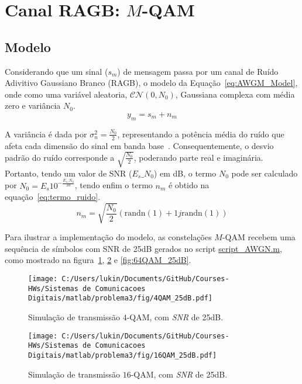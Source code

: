 \section{Canal RAGB: \texorpdfstring{$M$}{M}-QAM}
\subsection{Modelo}
Considerando que um sinal ($s_m$) de mensagem passa por um canal de Ruído Adivitivo Gaussiano Branco (RAGB), o modelo da Equação~\ref{eq:AWGM_Model}, onde como uma variável aleatoria, $\mathcal{C} \mathcal{N} (0,N_0)$, Gaussiana complexa com média zero e variância $N_0$. 
\begin{equation}
    y_m = s_m + n_m
    \label{eq:AWGM_Model}
\end{equation}

A variância é dada por $\sigma_{n}^{2} = \frac{N_0}{2}$, representando a potência média do ruído que afeta cada dimensão do sinal em banda base~\cite{Proakis}. Consequentemente, o desvio padrão do ruído corresponde a $\sqrt{\frac{N_0}{2}}$, poderando parte real e imaginária. Portanto, tendo um valor de SNR ($E_s\_N_0$) em dB, o termo $N_0$ pode ser calculado por $N_0= E_s 10^{-\frac{E_s\_N_0}{10}}$, tendo enfim o termo $n_m$ é obtido na equação~\ref{eq:termo_ruido}.
\begin{equation}
    n_m = \sqrt{\frac{N_0}{2}} \left(\text{randn}(1) + 1j \text{randn}(1)\right)
    \label{eq:termo_ruido}
\end{equation}

Para ilustrar a implementação do modelo, as constelações $M$-QAM recebem uma sequência de símbolos com SNR de 25dB gerados no script \href{https://raw.githubusercontent.com/lucasabdalah/Courses-HWs/SCD/Sistemas%20de%20Comunicacoes%20Digitais/matlab/problema3/script_AWGN.m}{\colorbox{gray!10}{\color{red}script\_AWGN.m}}, como mostrado na figura~\ref{fig:4QAM_25dB}, \ref{fig:16QAM_25dB} e \ref{fig:64QAM_25dB}.

\begin{figure}[!ht]
    \centering
    \texttt{[image: C:/Users/lukin/Documents/GitHub/Courses-HWs/Sistemas de Comunicacoes Digitais/matlab/problema3/fig/4QAM\_25dB.pdf]}
    \caption{Simulação de transmissão $4$-QAM, com \textit{SNR} de 25dB.}
    \label{fig:4QAM_25dB}
\end{figure}

\begin{figure}[!ht]
    \centering
    \texttt{[image: C:/Users/lukin/Documents/GitHub/Courses-HWs/Sistemas de Comunicacoes Digitais/matlab/problema3/fig/16QAM\_25dB.pdf]}
    \caption{Simulação de transmissão $16$-QAM, com \textit{SNR} de 25dB.}
    \label{fig:16QAM_25dB}
\end{figure}

